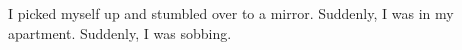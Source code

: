 I picked myself up and stumbled over to a mirror. Suddenly, I was
in my apartment. Suddenly, I was sobbing. 

 



%
%
%
%
%
%
%
%
% 
%
%
%
%
%
%
%
% 
%
%
